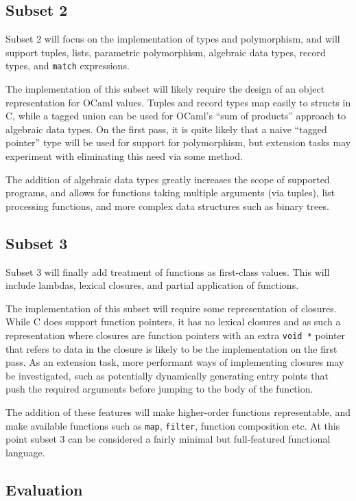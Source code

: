 \subsection*{Subset 2}

Subset 2 will focus on the implementation of types and polymorphism, and will
support tuples, lists, parametric polymorphism, algebraic data types, record
types, and \texttt{match} expressions.

The implementation of this subset will likely require the design of an object
representation for OCaml values. Tuples and record types map easily to structs
in C, while a tagged union can be used for OCaml's ``sum of products'' approach
to algebraic data types. On the first pass, it is quite likely that a naive
``tagged pointer'' type will be used for support for polymorphism, but
extension tasks may experiment with eliminating this need via some method.

The addition of algebraic data types greatly increases the scope of supported
programs, and allows for functions taking multiple arguments (via tuples), list
processing functions, and more complex data structures such as binary trees.

\subsection*{Subset 3}

Subset 3 will finally add treatment of functions as first-class values. This
will include lambdas, lexical closures, and partial application of functions.

The implementation of this subset will require some representation of closures.
While C does support function pointers, it has no lexical closures and as such
a representation where closures are function pointers with an extra
\texttt{void *} pointer that refers to data in the closure is likely to be the
implementation on the first pass. As an extension task, more performant ways of
implementing closures may be investigated, such as potentially dynamically
generating entry points that push the required arguments before jumping to the
body of the function. 

The addition of these features will make higher-order functions representable,
and make available functions such as \texttt{map}, \texttt{filter}, function
composition etc. At this point subset 3 can be considered a fairly minimal but
full-featured functional language.

\subsection*{Evaluation}

